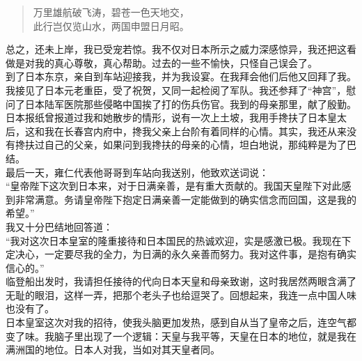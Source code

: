 \begin{quote}
	万里雄航破飞涛，碧苍一色天地交，\\

此行岂仅览山水，两国申盟日月昭。\\
\end{quote}

总之，还未上岸，我已受宠若惊。我不仅对日本所示之威力深感惊异，我还把这看做是对我的真心尊敬，真心帮助。过去的一些不愉快，只怪自己误会了。\\

到了日本东京，亲自到车站迎接我，并为我设宴。在我拜会他们后他又回拜了我。我接见了日本元老重臣，受了祝贺，又同一起检阅了军队。我还参拜了“神宫”，慰问了日本陆军医院那些侵略中国挨了打的伤兵伤官。我到的母亲那里，献了殷勤。日本报纸曾报道过我和她散步的情形，说有一次上土坡，我用手搀扶了日本皇太后，这和我在长春宫内府中，搀我父亲上台阶有着同样的心情。其实，我还从来没有搀扶过自己的父亲，如果问到我搀扶的母亲的心情，坦白地说，那纯粹是为了巴结。\\

最后一天，雍仁代表他哥哥到车站向我送别，他致欢送词说：\\

“皇帝陛下这次到日本来，对于日满亲善，是有重大贡献的。我国天皇陛下对此感到非常满意。务请皇帝陛下抱定日满亲善一定能做到的确实信念而回国，这是我的希望。”\\

我又十分巴结地回答道：\\

“我对这次日本皇室的隆重接待和日本国民的热诚欢迎，实是感激已极。我现在下定决心，一定要尽我的全力，为日满的永久亲善而努力。我对这件事，是抱有确实信心的。”\\

临登船出发时，我请担任接待的代向日本天皇和母亲致谢，这时我居然两眼含满了无耻的眼泪，这样一弄，把那个老头子也给逗哭了。回想起来，我连一点中国人味也没有了。\\

日本皇室这次对我的招待，使我头脑更加发热，感到自从当了皇帝之后，连空气都变了味。我脑子里出现了一个逻辑：天皇与我平等，天皇在日本的地位，就是我在满洲国的地位。日本人对我，当如对其天皇者同。\\

